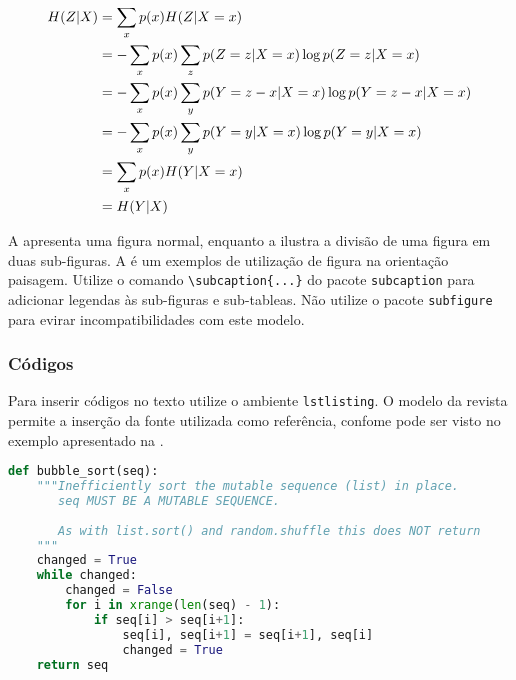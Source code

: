 \documentclass{textolivre}
\begin{document}
\begin{subequations}
\allowdisplaybreaks
\begin{align}
H(Z|X) &= \sum_x p(x) H(Z|X=x) \label{eq-align-ex1} \\
       &= - \sum_x p(x) \sum_z p(Z=z|X=x) \log p(Z=z|X=x) \label{eq-align-ex2}\\
       &= - \sum_x p(x) \sum_y p(Y=z-x|X=x) \log p(Y=z-x|X=x) \label{eq-align-ex3} \\
       &= - \sum_x p(x) \sum_y p(Y=y|X=x) \log p(Y=y|X=x) \label{eq-align-ex4} \\
       &= \sum_x p(x) H(Y|X=x) \label{eq-align-ex5} \\
       &= H(Y|X) \label{eq-align-ex6}
\end{align}
\end{subequations}

A  apresenta uma figura normal, enquanto 
a  ilustra a divisão de uma figura em duas sub-figuras. 
A  é um exemplos de utilização de figura na orientação paisagem.
Utilize o comando \verb|\subcaption{...}| do pacote \texttt{subcaption} para adicionar legendas 
às sub-figuras e sub-tableas. Não utilize o pacote \texttt{subfigure} para evirar incompatibilidades com este modelo.


\lipsum[10-14]



\subsubsection{Códigos}\label{sec-codigos}
Para inserir códigos no texto utilize o ambiente \texttt{lstlisting}. 
O modelo da revista permite a inserção da fonte utilizada como referência, confome 
pode ser visto no exemplo apresentado na .
 
\begin{lstlisting}[language=python, label=lst-code, caption={\emph{Bubble sort}, ou ordenação por flutuação.}, source={Rosetta Code (\url{https://rosettacode.org/wiki/Sorting_algorithms/Bubble_sort}).}]
def bubble_sort(seq):
    """Inefficiently sort the mutable sequence (list) in place.
       seq MUST BE A MUTABLE SEQUENCE.
 
       As with list.sort() and random.shuffle this does NOT return 
    """
    changed = True
    while changed:
        changed = False
        for i in xrange(len(seq) - 1):
            if seq[i] > seq[i+1]:
                seq[i], seq[i+1] = seq[i+1], seq[i]
                changed = True
    return seq
\end{lstlisting} %
\end{document}

